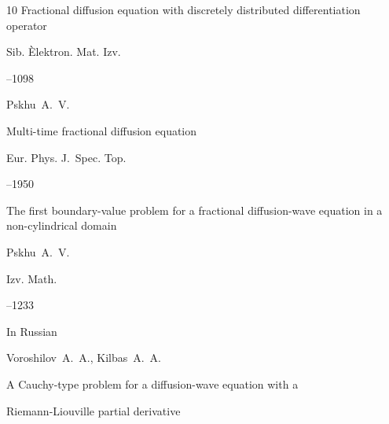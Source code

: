\begin{thebibliography}{10}
\paper Fractional diffusion equation with discretely distributed differentiation operator

\jour Sib. \`Elektron. Mat. Izv.



--1098









\by Pskhu~A.~V.

\paper Multi-time fractional diffusion equation

\jour Eur. Phys. J.~Spec. Top.




--1950







\paper The first boundary-value problem for a fractional diffusion-wave equation in a non-cylindrical domain

\by Pskhu~A.~V.

\jour Izv. Math.




--1233











\lang In Russian

\by Voroshilov~A.~A., Kilbas~A.~A.

\paper A Cauchy-type problem for a diffusion-wave equation with a

Riemann-Liouville partial derivative


\end{thebibliography}
